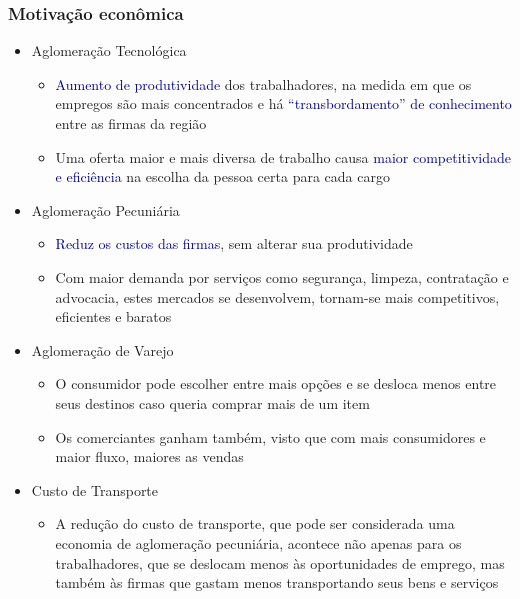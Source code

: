 \documentclass[%
    9pt, 
    aspectratio=169,
]{beamer}
\begin{document}
\begin{frame}
    \frametitle{Motivação econômica \cite{brueckner2011lectures}}
    \begin{itemize}
        \item<1-> Aglomeração Tecnológica
        \begin{itemize}
            \item<1> \textcolor{DarkBlue}{Aumento de produtividade} dos trabalhadores, na medida em que os empregos são mais concentrados e há \textcolor{DarkBlue}{``transbordamento'' de conhecimento} entre as firmas da região
            \item<1> Uma oferta maior e mais diversa de trabalho causa \textcolor{DarkBlue}{maior competitividade e eficiência} na escolha da pessoa certa para cada cargo
        \end{itemize}
        \item<2-> Aglomeração Pecuniária
        \begin{itemize}
            \item<2> \textcolor{DarkBlue}{Reduz os custos das firmas}, sem alterar sua produtividade
            \item<2> Com maior demanda por serviços como segurança, limpeza, contratação e advocacia, estes mercados se desenvolvem, tornam-se mais competitivos, eficientes e baratos
        \end{itemize}
        \item<3-> Aglomeração de Varejo
        \begin{itemize}
            \item<3> O consumidor pode escolher entre mais opções e se desloca menos entre seus destinos caso queria comprar mais de um item
            \item<3> Os comerciantes ganham também, visto que com mais consumidores e maior fluxo, maiores as vendas
        \end{itemize}
        \item<4-> Custo de Transporte
        \begin{itemize}
            \item<4> A redução do custo de transporte, que pode ser considerada uma economia de aglomeração pecuniária, acontece não apenas para os trabalhadores, que se deslocam menos às oportunidades de emprego, mas também às firmas que gastam menos transportando seus bens e serviços
        \end{itemize}
    \end{itemize}

\end{frame}
\end{document}
